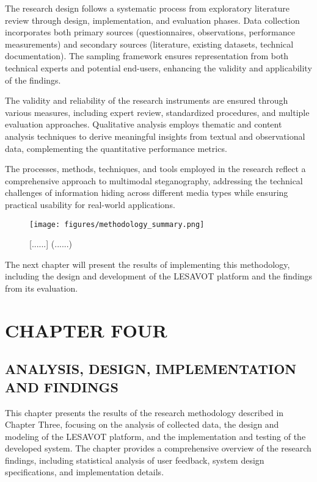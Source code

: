 \documentclass[12pt, a4paper, oneside]{book}
\begin{document}
The research design follows a systematic process from exploratory literature review through design, implementation, and evaluation phases. Data collection incorporates both primary sources (questionnaires, observations, performance measurements) and secondary sources (literature, existing datasets, technical documentation). The sampling framework ensures representation from both technical experts and potential end-users, enhancing the validity and applicability of the findings.

The validity and reliability of the research instruments are ensured through various measures, including expert review, standardized procedures, and multiple evaluation approaches. Qualitative analysis employs thematic and content analysis techniques to derive meaningful insights from textual and observational data, complementing the quantitative performance metrics.

The processes, methods, techniques, and tools employed in the research reflect a comprehensive approach to multimodal steganography, addressing the technical challenges of information hiding across different media types while ensuring practical usability for real-world applications.

\begin{figure}[htbp]
    \centering
    \texttt{[image: figures/methodology\_summary.png]}
    \caption{[......] (......)}
    \label{fig:methodology_summary}
\end{figure}

The next chapter will present the results of implementing this methodology, including the design and development of the LESAVOT platform and the findings from its evaluation.

\chapter{CHAPTER FOUR}

\section{ANALYSIS, DESIGN, IMPLEMENTATION AND FINDINGS}

This chapter presents the results of the research methodology described in Chapter Three, focusing on the analysis of collected data, the design and modeling of the LESAVOT platform, and the implementation and testing of the developed system. The chapter provides a comprehensive overview of the research findings, including statistical analysis of user feedback, system design specifications, and implementation details.
\end{document}
